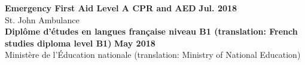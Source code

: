 \documentclass{article}
\begin{document}
\textbf{Emergency First Aid Level A CPR and AED} \hfill \textbf{Jul. 2018}\\
St. John Ambulance\\[0.5em]
\textbf{Dipl\^ome d'\'etudes en langues fran\c{c}aise niveau B1 (translation: French studies diploma level B1)} \hfill \textbf{May 2018}\\
Minist\`ere de l'\'Education nationale (translation: Ministry of National Education)
\end{document}
